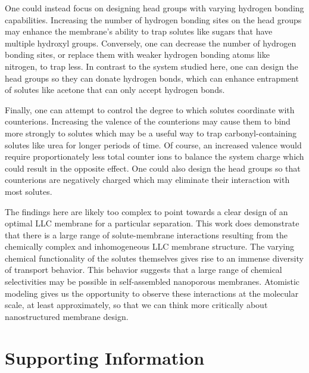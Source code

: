 \documentclass[journal=jpcbfk,manuscript=article]{achemso}
\begin{document}
  
  One could instead focus on designing head groups with varying hydrogen bonding
  capabilities. Increasing the number of hydrogen bonding sites on the head 
  groups may enhance the membrane's ability to trap solutes like sugars that 
  have multiple hydroxyl groups. Conversely, one can decrease the number of hydrogen
  bonding sites, or replace them with weaker hydrogen bonding atoms like nitrogen, to
  trap less. In contrast to the system studied here, one can design the head 
  groups so they can donate hydrogen bonds, which can enhance entrapment of 
  solutes like acetone that can only accept hydrogen bonds.
  
  Finally, one can attempt to control the degree to which solutes coordinate
  with counterions. Increasing the valence of the counterions may cause them
  to bind more strongly to solutes which may be a useful way to trap 
  carbonyl-containing solutes like urea for longer periods of time. Of course,
  an increased valence would require proportionately less total counter ions
  to balance the system charge which could result in the opposite effect. One
  could also design the head groups so that counterions are negatively charged
  which may eliminate their interaction with most solutes.
 
%  
  
  The findings here are likely too complex to point towards a clear design of an 
  optimal LLC membrane for a particular separation. This work does demonstrate
  that there is a large range of solute-membrane interactions resulting from the
  chemically complex and inhomogeneous LLC membrane structure. The varying 
  chemical functionality of the solutes themselves gives rise to an immense diversity of
  transport behavior. This behavior suggests that a large range of chemical 
  selectivities may be possible in self-assembled nanoporous membranes. Atomistic
  modeling gives us the opportunity to observe these interactions at the molecular
  scale, at least approximately, so that we can think more critically about 
  nanostructured membrane design. 

  \section*{Supporting Information}
\end{document}
